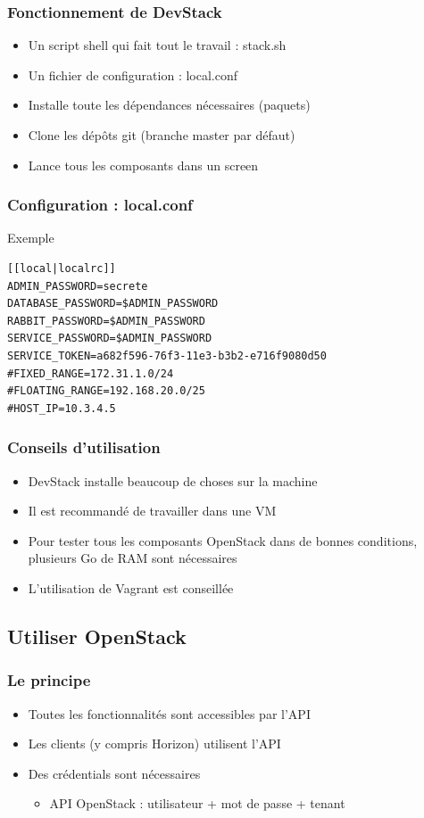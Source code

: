   \begin{frame}
    \frametitle{Fonctionnement de DevStack}
    \begin{itemize}
      \item Un script shell qui fait tout le travail : stack.sh
      \item Un fichier de configuration : local.conf
      \item Installe toute les dépendances nécessaires (paquets)
      \item Clone les dépôts git (branche master par défaut)
      \item Lance tous les composants dans un screen
    \end{itemize}
  \end{frame}

  \begin{frame}[containsverbatim]
    \frametitle{Configuration : local.conf}
    Exemple
\begin{verbatim}
[[local|localrc]]
ADMIN_PASSWORD=secrete
DATABASE_PASSWORD=$ADMIN_PASSWORD
RABBIT_PASSWORD=$ADMIN_PASSWORD
SERVICE_PASSWORD=$ADMIN_PASSWORD
SERVICE_TOKEN=a682f596-76f3-11e3-b3b2-e716f9080d50
#FIXED_RANGE=172.31.1.0/24
#FLOATING_RANGE=192.168.20.0/25
#HOST_IP=10.3.4.5
\end{verbatim}
  \end{frame}

  \begin{frame}
    \frametitle{Conseils d'utilisation}
    \begin{itemize}
      \item DevStack installe beaucoup de choses sur la machine
      \item Il est recommandé de travailler dans une VM
      \item Pour tester tous les composants OpenStack dans de bonnes conditions, plusieurs Go de RAM sont nécessaires
      \item L'utilisation de Vagrant est conseillée
    \end{itemize}
  \end{frame}

  \subsection[Utilisation]{Utiliser OpenStack}

  \begin{frame}
    \frametitle{Le principe}
    \begin{itemize}
      \item Toutes les fonctionnalités sont accessibles par l'API
      \item Les clients (y compris Horizon) utilisent l'API
      \item Des crédentials sont nécessaires
      \begin{itemize}
        \item API OpenStack : utilisateur + mot de passe + tenant
      \end{itemize}
    \end{itemize}
  \end{frame}

